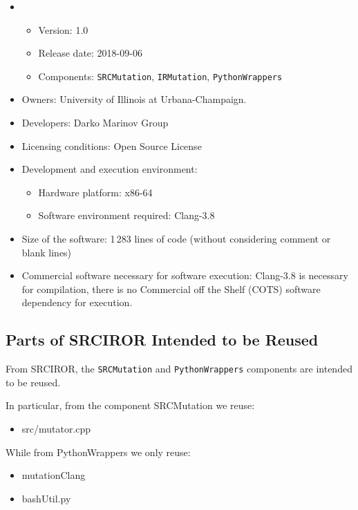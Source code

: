 \begin{itemize}
	\item {}
	\begin{itemize}
		\item Version: 1.0
		\item Release date: 2018-09-06
		\item Components: \texttt{SRCMutation}, \texttt{IRMutation}, \texttt{PythonWrappers}
	\end{itemize}
	\item Owners: University of Illinois at Urbana-Champaign.
	\item Developers: Darko Marinov Group
	\item Licensing conditions: Open Source License
	\item Development and execution environment:
	\begin{itemize}
		\item Hardware platform: x86-64
		\item Software environment required: Clang-3.8
	\end{itemize}
	\item Size of the software: 1\,283 lines of code (without considering comment or blank lines)
	\item Commercial software necessary for software execution: Clang-3.8 is necessary for compilation, there is no Commercial off the Shelf (COTS) software dependency for execution.
\end{itemize}

\subsection{Parts of SRCIROR Intended to be Reused}


From SRCIROR, the \texttt{SRCMutation} and \texttt{PythonWrappers} components are intended to be reused.

In particular, from the component SRCMutation we reuse:
\begin{itemize}
	\item src/mutator.cpp
\end{itemize}

While from PythonWrappers we only reuse:

\begin{itemize}
	\item mutationClang
	\item bashUtil.py
\end{itemize}

